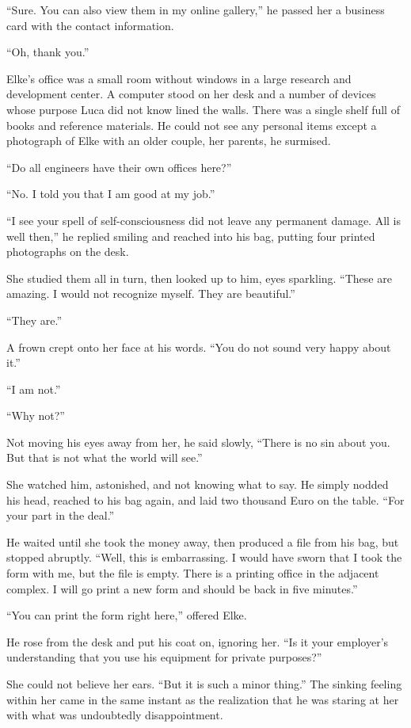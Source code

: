 ``Sure. You can also view them in my online gallery,'' he passed her a business card with the contact information.

``Oh, thank you.''

\sectionline

Elke's office was a small room without windows in a large research and development center. A computer stood on her desk and a number of devices whose purpose Luca did not know lined the walls. There was a single shelf full of books and reference materials. He could not see any personal items except a photograph of Elke with an older couple, her parents, he surmised.

``Do all engineers have their own offices here?''

``No. I told you that I am good at my job.''

``I see your spell of self-consciousness did not leave any permanent damage. All is well then,'' he replied smiling and reached into his bag, putting four printed photographs on the desk.

She studied them all in turn, then looked up to him, eyes sparkling. ``These are amazing. I would not recognize myself. They are beautiful.''

``They are.''

A frown crept onto her face at his words. ``You do not sound very happy about it.''

``I am not.''

``Why not?''

Not moving his eyes away from her, he said slowly, ``There is no sin about you. But that is not what the world will see.''

She watched him, astonished, and not knowing what to say. He simply nodded his head, reached to his bag again, and laid two thousand Euro on the table. ``For your part in the deal.''

He waited until she took the money away, then produced a file from his bag, but stopped abruptly. ``Well, this is embarrassing. I would have sworn that I took the form with me, but the file is empty. There is a printing office in the adjacent complex. I will go print a new form and should be back in five minutes.''

``You can print the form right here,'' offered Elke.

He rose from the desk and put his coat on, ignoring her. ``Is it your employer's understanding that you use his equipment for private purposes?''

She could not believe her ears. ``But it is such a minor thing.'' The sinking feeling within her came in the same instant as the realization that he was staring at her with what was undoubtedly disappointment.


